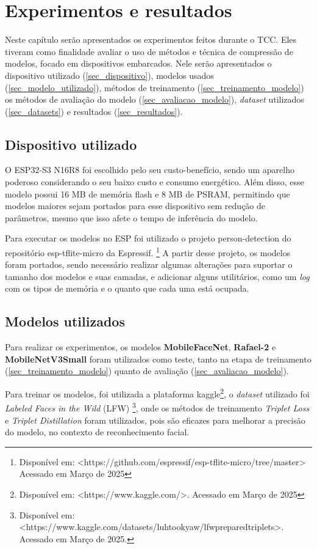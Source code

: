 \chapter{Experimentos e resultados}

Neste capítulo serão apresentados os experimentos feitos durante o TCC. Eles tiveram como
finalidade avaliar o uso de métodos e técnica de compressão de modelos, focado em dispositivos
embarcados. Nele serão apresentados o dispositivo utilizado (\autoref{sec_dispositivo}),
modelos usados (\autoref{sec_modelo_utilizado}), métodos de treinamento (\autoref{sec_treinamento_modelo})
os métodos de avaliação do modelo (\autoref{sec_avaliacao_modelo}), \textit{dataset} utilizados
(\autoref{sec_datasets}) e resultados (\autoref{sec_resultados}).

\section{Dispositivo utilizado}\label{sec_dispositivo}
O ESP32-S3 N16R8 foi escolhido pelo seu custo-benefício, sendo um aparelho poderoso considerando o seu baixo
custo e consumo energético. Além disso, esse modelo possui 16 MB de memória flash e 8 MB de PSRAM,
permitindo que modelos maiores sejam portados para esse dispositivo sem redução de parâmetros, mesmo que
isso afete o tempo de inferência do modelo.

Para executar os modelos no ESP foi utilizado o projeto person-detection do repositório esp-tflite-micro da Espressif.
\footnote{Disponível em: <https://github.com/espressif/esp-tflite-micro/tree/master> Acessado em Março de 2025}
A partir desse projeto, os modelos foram portados, sendo necessário realizar algumas alterações para suportar o
tamanho dos modelos e suas camadas, e adicionar alguns utilitários, como um \textit{log} com os tipos de memória
e o quanto que cada uma está ocupada.

\section{Modelos utilizados}\label{sec_modelo_utilizado}
Para realizar os experimentos, os modelos \textbf{MobileFaceNet}, \textbf{Rafael-2} e \textbf{MobileNetV3Small}
foram utilizados como teste, tanto na etapa de treinamento (\autoref{sec_treinamento_modelo}) quanto de avaliação
(\autoref{sec_avaliacao_modelo}).

Para treinar os modelos, foi utilizada a plataforma kaggle\footnote{
Disponível em: <https://www.kaggle.com/>. Acessado em Março de 2025}, o \textit{dataset} utilizado foi
\textit{Labeled Faces in the Wild} (LFW) \footnote{
Disponível em: <https://www.kaggle.com/datasets/luhtookyaw/lfwpreparedtriplets>. Acessado em Março de 2025.},
onde os métodos de treinamento \textit{Triplet Loss} e \textit{Triplet Distillation}
\cite{triplet_distillation_face_recognition} foram utilizados, pois são eficazes para melhorar a precisão do modelo,
no contexto de reconhecimento facial.

